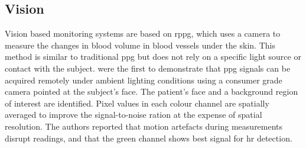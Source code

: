 \documentclass[11pt, parskip=half*,twoside=false]{scrbook}
\begin{document}
\subsection{Vision}
Vision based monitoring systems are based on \gls{rppg}, which uses a camera to measure the changes in blood volume in blood vessels under the skin. This method is similar to traditional \gls{ppg} but does not rely on a specific light source or contact with the subject. \citet{verkruysseRemotePlethysmographicImaging2008} were the first to demonstrate that \gls{ppg} signals can be acquired remotely under ambient lighting conditions using a consumer grade camera pointed at the subject's face. The patient's face and a background region of interest are identified. Pixel values in each colour channel are spatially averaged to improve the signal-to-noise ration at the expense of spatial resolution. The authors reported that motion artefacts during measurements disrupt readings, and that the green channel shows best signal for \gls{hr} detection.
\end{document}
